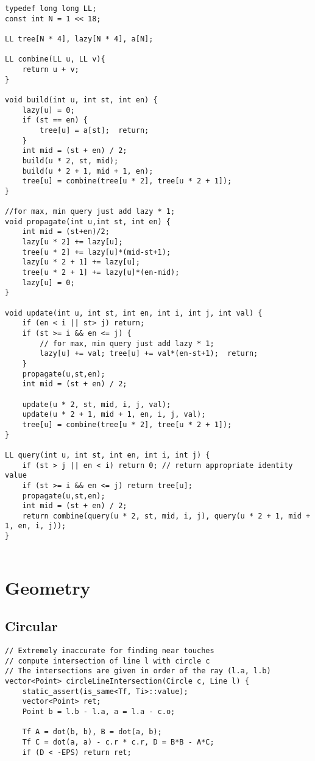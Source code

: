\documentclass[FSZ,a4paper,onesided]{article}
\begin{document}
\begin{multicols*}{\COLS}
\begin{lstlisting}
typedef long long LL;
const int N = 1 << 18;

LL tree[N * 4], lazy[N * 4], a[N];

LL combine(LL u, LL v){
    return u + v;
}

void build(int u, int st, int en) {
    lazy[u] = 0;
    if (st == en) {
        tree[u] = a[st];  return;
    }
    int mid = (st + en) / 2;
    build(u * 2, st, mid);
    build(u * 2 + 1, mid + 1, en);
    tree[u] = combine(tree[u * 2], tree[u * 2 + 1]);
}

//for max, min query just add lazy * 1;
void propagate(int u,int st, int en) {
    int mid = (st+en)/2;
    lazy[u * 2] += lazy[u];
    tree[u * 2] += lazy[u]*(mid-st+1);   
    lazy[u * 2 + 1] += lazy[u];
    tree[u * 2 + 1] += lazy[u]*(en-mid);
    lazy[u] = 0;
}

void update(int u, int st, int en, int i, int j, int val) {
    if (en < i || st> j) return;
    if (st >= i && en <= j) {
        // for max, min query just add lazy * 1;
        lazy[u] += val; tree[u] += val*(en-st+1);  return;
    }
    propagate(u,st,en);
    int mid = (st + en) / 2;

    update(u * 2, st, mid, i, j, val);
    update(u * 2 + 1, mid + 1, en, i, j, val);
    tree[u] = combine(tree[u * 2], tree[u * 2 + 1]);
}

LL query(int u, int st, int en, int i, int j) {
    if (st > j || en < i) return 0; // return appropriate identity value
    if (st >= i && en <= j) return tree[u];
    propagate(u,st,en);
    int mid = (st + en) / 2;
    return combine(query(u * 2, st, mid, i, j), query(u * 2 + 1, mid + 1, en, i, j));
} 


\end{lstlisting}
\section{Geometry}
\subsection{Circular}
\begin{lstlisting}
// Extremely inaccurate for finding near touches
// compute intersection of line l with circle c
// The intersections are given in order of the ray (l.a, l.b)
vector<Point> circleLineIntersection(Circle c, Line l) {
    static_assert(is_same<Tf, Ti>::value);
    vector<Point> ret;
    Point b = l.b - l.a, a = l.a - c.o;

    Tf A = dot(b, b), B = dot(a, b);
    Tf C = dot(a, a) - c.r * c.r, D = B*B - A*C;
    if (D < -EPS) return ret;


\end{lstlisting}
\end{multicols*}
\end{document}
